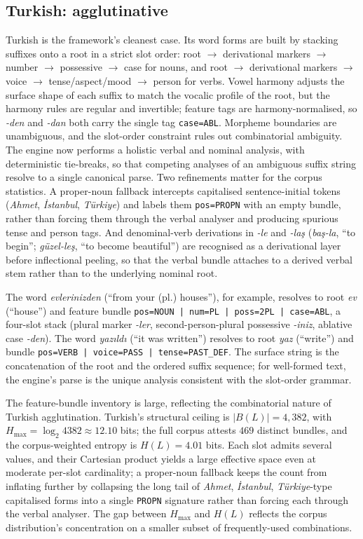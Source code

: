 \subsection{Turkish: agglutinative}
\label{sec:cases-tr}

Turkish is the framework's cleanest case. Its word forms are built by stacking suffixes onto a root in a strict slot order: root $\to$ derivational markers $\to$ number $\to$ possessive $\to$ case for nouns, and root $\to$ derivational markers $\to$ voice $\to$ tense/aspect/mood $\to$ person for verbs. Vowel harmony adjusts the surface shape of each suffix to match the vocalic profile of the root, but the harmony rules are regular and invertible; feature tags are harmony-normalised, so \emph{-den} and \emph{-dan} both carry the single tag \texttt{case=ABL}. Morpheme boundaries are unambiguous, and the slot-order constraint rules out combinatorial ambiguity. The engine now performs a holistic verbal and nominal analysis, with deterministic tie-breaks, so that competing analyses of an ambiguous suffix string resolve to a single canonical parse. Two refinements matter for the corpus statistics. A proper-noun fallback intercepts capitalised sentence-initial tokens (\emph{Ahmet}, \emph{\.{I}stanbul}, \emph{T\"urkiye}) and labels them \texttt{pos=PROPN} with an empty bundle, rather than forcing them through the verbal analyser and producing spurious tense and person tags. And denominal-verb derivations in \emph{-le} and \emph{-la\c{s}} (\emph{ba\c{s}-la}, ``to begin''; \emph{g\"uzel-le\c{s}}, ``to become beautiful'') are recognised as a derivational layer before inflectional peeling, so that the verbal bundle attaches to a derived verbal stem rather than to the underlying nominal root.

The word \emph{evlerinizden} (``from your (pl.) houses''), for example, resolves to root \emph{ev} (``house'') and feature bundle \texttt{pos=NOUN | num=PL | poss=2PL | case=ABL}, a four-slot stack (plural marker \emph{-ler}, second-person-plural possessive \emph{-iniz}, ablative case \emph{-den}). The word \emph{yaz{\i}ld{\i}} (``it was written'') resolves to root \emph{yaz} (``write'') and bundle \texttt{pos=VERB | voice=PASS | tense=PAST\_DEF}. The surface string is the concatenation of the root and the ordered suffix sequence; for well-formed text, the engine's parse is the unique analysis consistent with the slot-order grammar.

The feature-bundle inventory is large, reflecting the combinatorial nature of Turkish agglutination. Turkish's structural ceiling is $|B(L)| = 4{,}382$, with $H_{\max} = \log_2 4382 \approx 12.10$ bits; the full corpus attests $469$ distinct bundles, and the corpus-weighted entropy is $H(L) = 4.01$ bits. Each slot admits several values, and their Cartesian product yields a large effective space even at moderate per-slot cardinality; a proper-noun fallback keeps the count from inflating further by collapsing the long tail of \emph{Ahmet}, \emph{\.{I}stanbul}, \emph{T\"urkiye}-type capitalised forms into a single \texttt{PROPN} signature rather than forcing each through the verbal analyser. The gap between $H_{\max}$ and $H(L)$ reflects the corpus distribution's concentration on a smaller subset of frequently-used combinations.

